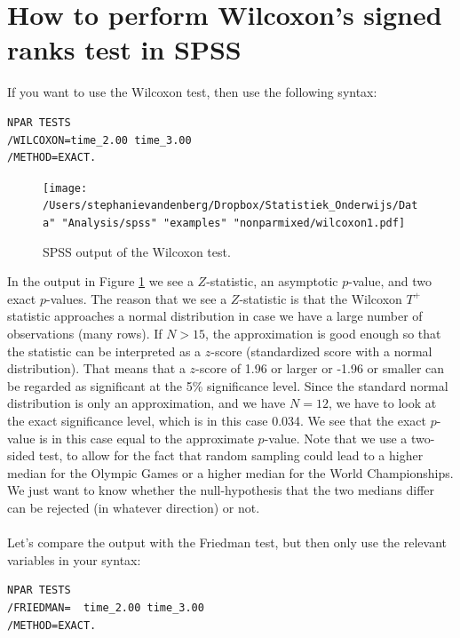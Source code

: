 \documentclass[]{book}\usepackage[]{graphicx}\usepackage[]{color}
\begin{document}
\section{How to perform Wilcoxon's signed ranks test in SPSS}

If you want to use the Wilcoxon test, then use the following syntax:

\begin{verbatim}
NPAR TESTS
/WILCOXON=time_2.00 time_3.00
/METHOD=EXACT.
\end{verbatim}


\begin{figure}[h]
    \begin{center}
       \texttt{[image: /Users/stephanievandenberg/Dropbox/Statistiek\_Onderwijs/Data" "Analysis/spss" "examples" "nonparmixed/wilcoxon1.pdf]}
    \end{center}
    \caption{SPSS output of the Wilcoxon test.}
    \label{fig:wilcoxon1}
\end{figure}

In the output in Figure \ref{fig:wilcoxon1} we see a $Z$-statistic, an asymptotic $p$-value, and two exact $p$-values. The reason that we see a $Z$-statistic is that the Wilcoxon $T^+$ statistic approaches a normal distribution in case we have a large number of observations (many rows). If $N>15$, the approximation is good enough so that the statistic can be interpreted as a $z$-score (standardized score with a normal distribution). That means that a $z$-score of 1.96 or larger or -1.96 or smaller can be regarded as significant at the 5\% significance level. Since the standard normal distribution is only an approximation, and we have $N=12$, we have to look at the exact significance level, which is in this case 0.034. We see that the exact $p$-value is in this case equal to the approximate $p$-value. Note that we use a two-sided test, to allow for the fact that random sampling could lead to a higher median for the Olympic Games or a higher median for the World Championships. We just want to know whether the null-hypothesis that the two medians differ can be rejected (in whatever direction) or not.
\\
\\


Let's compare the output with the Friedman test, but then only use the relevant variables in your syntax:

\begin{verbatim}
NPAR TESTS
/FRIEDMAN=  time_2.00 time_3.00
/METHOD=EXACT.
\end{verbatim}
\end{document}
